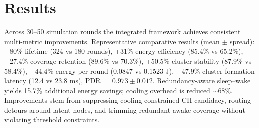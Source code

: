 \section{Results}
Across 30--50 simulation rounds the integrated framework achieves consistent multi-metric improvements. Representative comparative results (mean $\pm$ spread): +80\% lifetime (324 vs 180 rounds), +31\% energy efficiency (85.4\% vs 65.2\%), +27.4\% coverage retention (89.6\% vs 70.3\%), +50.5\% cluster stability (87.9\% vs 58.4\%), $-44.4$\% energy per round (0.0847 vs 0.1523 J), $-47.9$\% cluster formation latency (12.4 vs 23.8 ms), PDR $= 0.973 \pm 0.012$. Redundancy-aware sleep--wake yields 15.7\% additional energy savings; cooling overhead is reduced $\sim 68$\%. Improvements stem from suppressing cooling-constrained CH candidacy, routing detours around latent nodes, and trimming redundant awake coverage without violating threshold constraints.

